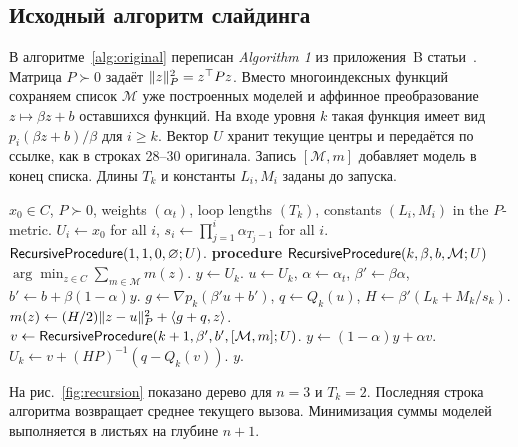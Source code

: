\subsection{Исходный алгоритм слайдинга}\label{sec:classical-algorithm}

В алгоритме~\ref{alg:original} переписан \emph{Algorithm 1} из
приложения~B статьи~\cite{borodich}. Матрица $P\succ0$ задаёт
$\lVert z\rVert_P^2=z^\top Pz$. Вместо многоиндексных функций сохраняем
список $\mathcal M$ уже построенных моделей и аффинное преобразование
$z\mapsto\beta z+b$ оставшихся функций. На входе уровня $k$ такая
функция имеет вид $p_i(\beta z+b)/\beta$ для $i\ge k$.
Вектор $U$ хранит текущие центры и передаётся по ссылке, как в
строках 28--30 оригинала. Запись $[\mathcal M,m]$ добавляет модель
в конец списка. Длины $T_k$ и константы $L_i,M_i$ заданы до запуска.

\begin{algorithm}[H]
\caption{Классический слайдинг Бородич, Гасникова и Ковалёва
в обозначениях отчёта}\label{alg:original}
\begin{algorithmic}[1]
\REQUIRE $x_0\in C$, $P\succ0$, weights $(\alpha_t)$,
  loop lengths $(T_k)$, constants $(L_i,M_i)$ in the $P$-metric.
\STATE $U_i\gets x_0$ for all $i$,
  $s_i\gets\prod_{j=1}^{i}\alpha_{T_j-1}$ for all $i$.
\RETURN $\textsf{RecursiveProcedure}(1,1,0,\varnothing;U)$.
\STATE \textbf{procedure} $\textsf{RecursiveProcedure}(k,\beta,b,\mathcal M;U)$
  \RETURN $\displaystyle\arg\min_{z\in C}\sum_{m\in\mathcal M}m(z)$.
\ENDIF
\STATE $y\gets U_k$.
  \STATE $u\gets U_k$, $\alpha\gets\alpha_t$,
    $\beta'\gets\beta\alpha$, $b'\gets b+\beta(1-\alpha)y$.
  \STATE $g\gets\nabla p_k(\beta'u+b')$, $q\gets Q_k(u)$,
    $H\gets\beta'(L_k+M_k/s_k)$.
  \STATE $m(z)\gets (H/2)\lVert z-u\rVert_P^2+\langle g+q,z\rangle$.
  \STATE $v\gets\textsf{RecursiveProcedure}(k+1,\beta',b',[\mathcal M,m];U)$.
  \STATE $y\gets(1-\alpha)y+\alpha v$.
  \STATE $U_k\gets v+(HP)^{-1}(q-Q_k(v))$.
\ENDFOR
\RETURN $y$.
\end{algorithmic}
\end{algorithm}

На рис.~\ref{fig:recursion} показано дерево для $n=3$ и $T_k=2$.
Последняя строка алгоритма возвращает среднее текущего вызова.
Минимизация суммы моделей выполняется в листьях на глубине $n+1$.

